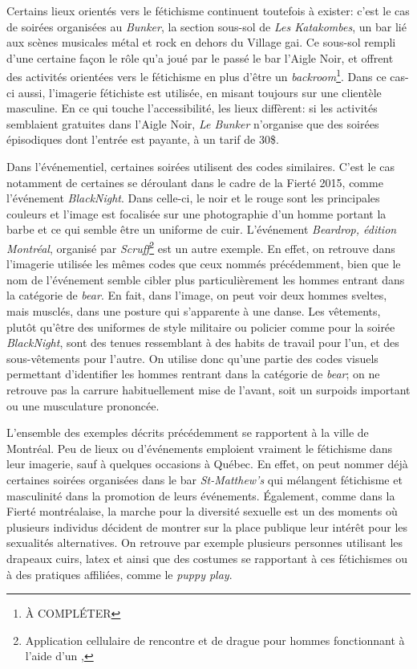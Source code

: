 Certains lieux orientés vers le fétichisme continuent toutefois à exister: c'est le cas de soirées organisées au \emph{Bunker}, la section sous-sol de \emph{Les Katakombes}, un bar lié aux scènes musicales métal et rock en dehors du Village gai.
Ce sous-sol rempli d'une certaine façon le rôle qu'a joué par le passé le bar l'Aigle Noir, et offrent des activités orientées vers le fétichisme en plus d'être un \emph{backroom}\footnote{À COMPLÉTER}.
Dans ce cas-ci aussi, l'imagerie fétichiste est utilisée, en misant toujours sur une clientèle masculine.
En ce qui touche l'accessibilité, les lieux diffèrent: si les activités semblaient gratuites dans l'Aigle Noir, \emph{Le Bunker} n'organise que des soirées épisodiques dont l'entrée est payante, à un tarif de 30\$.

Dans l'événementiel, certaines soirées utilisent des codes similaires.
C'est le cas notamment de certaines se déroulant dans le cadre de la Fierté 2015, comme l'événement \emph{BlackNight}.
Dans celle-ci, le noir et le rouge sont les principales couleurs et l'image est focalisée sur une photographie d'un homme portant la barbe et ce qui semble être un uniforme de cuir.
L'événement \emph{Beardrop, édition Montréal}, organisé par \emph{Scruff}\footnote{Application cellulaire de rencontre et de drague pour hommes fonctionnant à l'aide d'un \gps{},} est un autre exemple.
En effet, on retrouve dans l'imagerie utilisée les mêmes codes que ceux nommés précédemment, bien que le nom de l'événement semble cibler plus particulièrement les hommes entrant dans la catégorie de \emph{bear}.
En fait, dans l'image, on peut voir deux hommes sveltes, mais musclés, dans une posture qui s'apparente à une danse.
Les vêtements, plutôt qu'être des uniformes de style militaire ou policier comme pour la soirée \emph{BlackNight}, sont des tenues ressemblant à des habits de travail pour l'un, et des sous-vêtements pour l'autre.
On utilise donc qu'une partie des codes visuels permettant d'identifier les hommes rentrant dans la catégorie de \emph{bear}; on ne retrouve pas la carrure habituellement mise de l'avant, soit un surpoids important ou une musculature prononcée.

L'ensemble des exemples décrits précédemment se rapportent à la ville de Montréal.
Peu de lieux ou d'événements emploient vraiment le fétichisme dans leur imagerie, sauf à quelques occasions à Québec.
En effet, on peut nommer déjà certaines soirées organisées dans le bar \emph{St-Matthew's} qui mélangent fétichisme et masculinité dans la promotion de leurs événements.
Également, comme dans la Fierté montréalaise, la marche pour la diversité sexuelle est un des moments où plusieurs individus décident de montrer sur la place publique leur intérêt pour les sexualités alternatives.
On retrouve par exemple plusieurs personnes utilisant les drapeaux cuirs, latex et \bdsm{} ainsi que des costumes se rapportant à ces fétichismes ou à des pratiques affiliées, comme le \emph{puppy play}.


